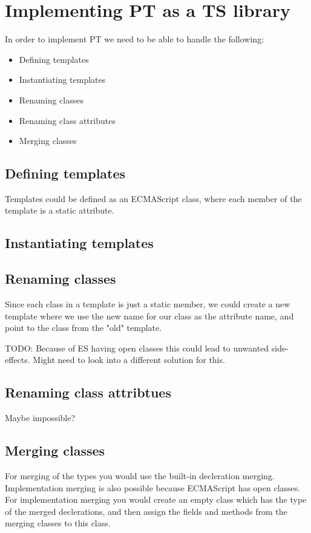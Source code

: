 \section{Implementing PT as a TS library}%
\label{sec:implementing_pt_as_a_ts_library}

In order to implement PT we need to be able to handle the following:

\begin{itemize}
    \item Defining templates
    \item Instantiating templates
    \item Renaming classes
    \item Renaming class attributes
    \item Merging classes
\end{itemize}

\subsection{Defining templates}%
\label{sub:defining_templates}

Templates could be defined as an ECMAScript class, where each member of the template is a static attribute. 

\subsection{Instantiating templates}%
\label{sub:instantiating_templates}

\subsection{Renaming classes}%
\label{sub:renaming_classes}

Since each class in a template is just a static member, we could create a new template where we use the new name for our class as the attribute name, and point to the class from the "old" template.

TODO: Because of ES having open classes this could lead to unwanted side-effects. Might need to look into a different solution for this.

\subsection{Renaming class attribtues}%
\label{sub:renaming_class_attribtues}

Maybe impossible?

\subsection{Merging classes}%
\label{sub:merging_classes}

For merging of the types you would use the built-in decleration merging\cite{declerationmerging}. Implementation merging is also possible because ECMAScript has open classes. For implementation merging you would create an empty class which has the type of the merged declerations, and then assign the fields and methods from the merging classes to this class.





